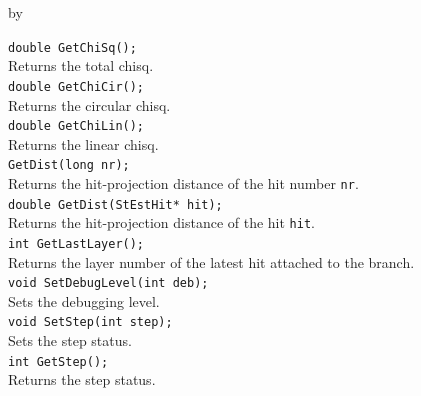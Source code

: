 \documentclass[twoside]{article}
\newcommand{\entrylabel}[1]{\mbox{\textbf{{#1}}}\hfil}%
\newenvironment{entry}
{\begin{list}{}%
    {\renewcommand{\makelabel}{\entrylabel}%
     \setlength{\labelwidth}{90pt}%
     \setlength{\leftmargin}{\labelwidth}
     \advance\leftmargin by \labelsep%
      }%
    }%
  {\end{list}}
\newcommand{\Entrylabel}[1]%
{\raisebox{0pt}[1ex][0pt]{\makebox[\labelwidth][l]%
    {\parbox[t]{\labelwidth}{\hspace{0pt}\textbf{{#1}}}}}}
\newenvironment{Entry}%
{\renewcommand{\entrylabel}{\Entrylabel}\begin{entry}}%
  {\end{entry}}
\begin{document}
\begin{Entry}
	\verb+double GetChiSq();+\\
	Returns the total chisq.\\
	\verb+double GetChiCir();+\\
	Returns the circular chisq.\\
	\verb+double GetChiLin();+\\
	Returns the linear chisq.\\
	\verb+GetDist(long nr);+\\
	Returns the hit-projection distance of the hit number \verb+nr+.\\
	\verb+double GetDist(StEstHit* hit);+\\
	Returns the hit-projection distance of the hit \verb+hit+.\\
	\verb+int GetLastLayer();+\\
	Returns the layer number of the latest hit attached to the branch.\\
	\verb+void SetDebugLevel(int deb);+\\
	Sets the debugging level.\\
	\verb+void SetStep(int step);+\\
	Sets the step status.\\
	\verb+int GetStep();+\\
	Returns the step status.\\	
\end{Entry}

%
%

\printindex
\end{document}
